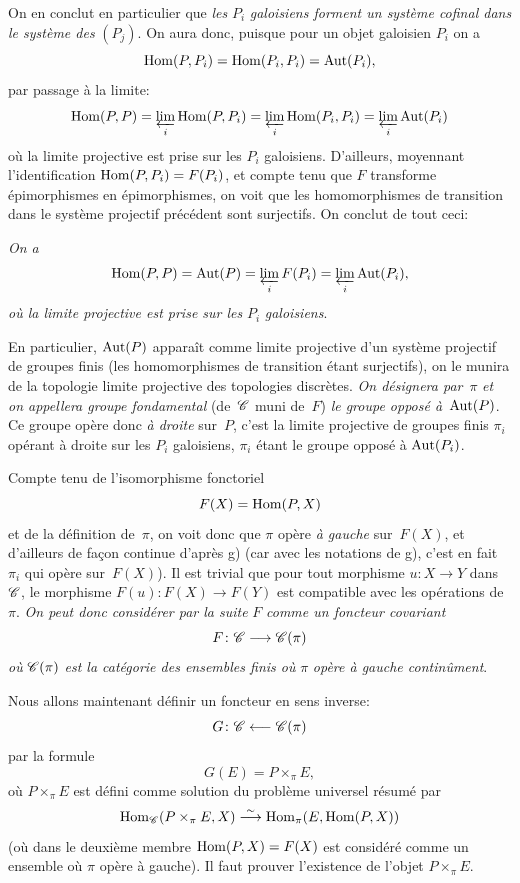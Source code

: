 \begin{enumerateb}
On en conclut en particulier que \emph{les} $P_i$ \emph{galoisiens
forment un système cofinal dans le système des} $(P_j)$. On
aura donc, puisque pour un objet galoisien $P_i$ on a
$$
\operatorname{Hom}(P,P_i)=\operatorname{Hom}(P_i,P_i)=\operatorname{Aut}(P_i),
$$
par passage \`a la limite:
$$
\operatorname{Hom}(P,P) = \varprojlim_{i} \operatorname{Hom}(P,P_i) = \varprojlim_{i} \operatorname{Hom}(P_i,P_i) =
\varprojlim_{i} \operatorname{Aut}(P_i)
$$
o\`u
\enlargethispage{.5cm}
la limite projective est prise sur les $P_i$ galoisiens. D'ailleurs,
moyennant l'identification $\operatorname{Hom}(P,P_i)=F(P_i)$, et compte tenu que
$F$ transforme \'epimorphismes en \'epimorphismes, on voit que les
homomorphismes de transition dans le syst\`eme projectif
pr\'ec\'edent sont surjectifs. On conclut de tout ceci:

\item[h)] \emph{On a}
$$
\operatorname{Hom}(P,P) = \operatorname{Aut}(P) = \varprojlim_{i} F(P_i) = \varprojlim_{i} \operatorname{Aut}(P_i),
$$
\emph{où la limite projective est prise sur les} $P_i$
\emph{galoisiens}.

En particulier, $\operatorname{Aut}(P)$ appara\^it comme limite projective d'un
syst\`eme projectif de groupes finis (les homomorphismes de
transition \'etant surjectifs), on le munira de la topologie limite
projective des topologies discr\`etes. \emph{On désignera
par}~$\pi$
\label{indnot:ec}\emph{et on appellera groupe fondamental}
(de~$\cal{C}$ muni de~$F$) \emph{le groupe opposé
à}~$\operatorname{Aut}(P)$. Ce groupe op\`ere donc \emph{à droite}
sur~$P$, c'est la limite projective de groupes finis $\pi_i$
op\'erant \`a droite sur les $P_i$ galoisiens, $\pi_i$ \'etant
le groupe oppos\'e \`a $\operatorname{Aut}(P_i)$.

Compte tenu de l'isomorphisme fonctoriel
$$
F(X)=\operatorname{Hom}(P,X)
$$
et de la d\'efinition de~$\pi$, on voit donc que $\pi$ op\`ere
\emph{à gauche} sur~$F(X)$, et d'ailleurs de fa\c con continue
d'apr\`es g) (car avec les notations de g), c'est en fait $\pi_i$
qui op\`ere sur~$F(X)$). Il est trivial que pour tout morphisme $u
\colon X \to Y$ dans $\cal{C}$, le morphisme $F(u) \colon F(X) \to
F(Y)$ est compatible avec les op\'erations de~$\pi$. \emph{On peut
donc considérer par la suite} $F$ \emph{comme un foncteur
covariant}
$$
F \colon \cal{C} \to \cal{C}(\pi)
$$
\emph{où} $\cal{C}(\pi)$ \emph{est la catégorie des ensembles
finis où} $\pi$ \emph{opère à gauche continûment}.

Nous allons maintenant d\'efinir un foncteur en sens inverse:
$$
G \colon \cal{C} \from \cal{C}(\pi)
$$
par la formule
$$
G(E)=P \times_{\pi} E,
$$
o\`u $P \times_{\pi} E$ est d\'efini comme solution du
probl\`eme universel r\'esum\'e par
$$
\Hom_{\cal{C}}(P \times_{\pi} E,X) \isomto \Hom_{\pi}(E,\Hom(P,X))
$$
(o\`u
dans le deuxi\`eme membre $\operatorname{Hom}(P,X)=F(X)$ est consid\'er\'e
comme un ensemble o\`u $\pi$ op\`ere \`a gauche). Il faut prouver
l'existence de l'objet $P \times_{\pi} E$.


\end{enumerateb}
